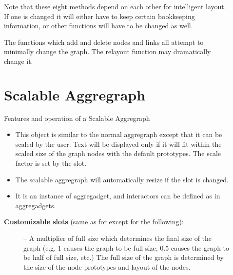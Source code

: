 \begin{description}
\item[]       
\item[] Note that these eight methods depend on each other for
intelligent layout. If one is changed it will either
have to keep certain bookkeeping information, or other
functions will have to be changed as well.

\item[] The functions which add and delete nodes and links all
attempt to minimally change the graph.  The relayout
function may dramatically change it.

\item[] \section{Scalable Aggregraph}

\item[] Features and operation of a Scalable Aggregraph
        \begin{itemize}
\item                 This object is similar to the normal aggregraph
                except that it can be scaled by the user.
                Text will be displayed only if it will fit within the
                scaled size of the graph nodes with the default prototypes.
		The scale factor is set by the  slot.

\item                 The scalable aggregraph will automatically resize if the
                 slot is changed.

\item                 It is an instance of aggregadget, and interactors can be
                defined as in aggregadgets.
        \end{itemize}

\item[] {\bf Customizable slots} (same as for  except for the following):

        \begin{description}
\item[]                  -- A multiplier of full size which determines
                the final size of the graph (e.g. 1 causes the graph to be
                full size, 0.5 causes the graph to be half of full size, etc.)
The full size of the graph is determined by the size of the node prototypes and
layout of the nodes.


\end{description}
\end{description}
